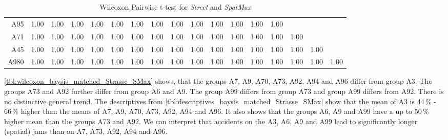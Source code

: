 \begin{table}[ht]
\begin{tabular}{rrrrrrrrrrrrrrrrr}
		A95 	& 1.00 & 1.00 & 1.00 & 1.00 & 1.00 & 1.00 & 1.00 & 1.00 & 1.00 & 1.00 & 1.00 & 1.00 & 1.00 &  &  &  \\ 
		A71 	& 1.00 & 1.00 & 1.00 & 1.00 & 1.00 & 1.00 & 1.00 & 1.00 & 1.00 & 1.00 & 1.00 & 1.00 & 1.00 & 1.00 &  &  \\ 
		A45 	& 1.00 & 1.00 & 1.00 & 1.00 & 1.00 & 1.00 & 1.00 & 1.00 & 1.00 & 1.00 & 1.00 & 1.00 & 1.00 & 1.00 & 1.00 &  \\ 
		A980 	& 1.00 & 1.00 & 1.00 & 1.00 & 1.00 & 1.00 & 1.00 & 1.00 & 1.00 & 1.00 & 1.00 & 1.00 & 1.00 & 1.00 & 1.00 & 1.00 \\ 
		\bottomrule
	\end{tabular}
	\caption{Wilcoxon Pairwise t-test for \textit{Street} and \textit{SpatMax}}
	\label{tbl:wilcoxon_baysis_matched_Strasse_SMax}
\end{table}
\autoref{tbl:wilcoxon_baysis_matched_Strasse_SMax} shows, that the groups A7, A9, A70, A73, A92, A94 and A96 differ from group A3. The groups A73 and A92 further differ from group A6 and A9. The group A99 differs from group A73 and group A99 differs from A92. There is no distinctive general trend. The descriptives from \autoref{tbl:descriptives_baysis_matched_Strasse_SMax} show that the mean of A3 is 44\,\% - 66\,\% higher than the means of A7, A9, A70, A73, A92, A94 and A96. It also shows that the groups A6, A9 and A99 have a up to 50\,\% higher mean than the groups A73 and A92. We can interpret that accidents on the A3, A6, A9 and A99 lead to significantly longer (spatial) jams than on A7, A73, A92, A94 and A96.
